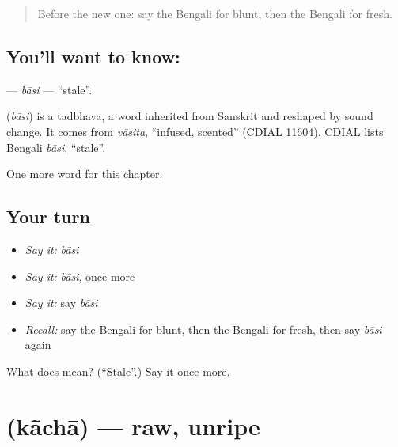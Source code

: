 \label{lesson:BN-C140-basi}



\begin{quote}
Before the new one: say the Bengali for blunt, then the Bengali for fresh.
\end{quote}

\subsection*{You'll want to know: }
\textbf{} — \emph{bāsi} — \textquotedblleft{}stale\textquotedblright{}.

\begin{cousinweb}
\textbf{} (\emph{bāsi}) is a tadbhava, a word inherited from Sanskrit and reshaped by sound change. It comes from \emph{vāsita}, \textquotedblleft{}infused, scented\textquotedblright{} (CDIAL 11604). CDIAL lists Bengali \emph{bāsi}, \textquotedblleft{}stale\textquotedblright{}.
\end{cousinweb}

\begin{grammarlens}[title={What you've built}]
One more word for this chapter.
\end{grammarlens}

\subsection*{Your turn}
\begin{itemize}
\raggedright
  \item \emph{Say it:} \emph{bāsi}
  \item \emph{Say it:} \emph{bāsi}, once more
  \item \emph{Say it:} say \emph{bāsi}
  \item \emph{Recall:} say the Bengali for blunt, then the Bengali for fresh, then say \emph{bāsi} again
\end{itemize}

\begin{tcolorbox}[breakable,colback=teal!4,colframe=teal!35!black,title={Before you move on}]
What does  mean? (\textquotedblleft{}Stale\textquotedblright{}.) Say it once more.
\end{tcolorbox}
\section[\texorpdfstring{\bn{কাঁচা} (kā̃chā)}{কাঁচা (kā̃chā)}]{ (kā̃chā) — raw, unripe}

